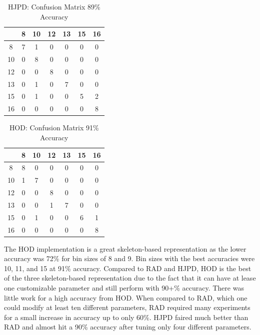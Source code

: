 \documentclass[11pt,nocopyrightspace]{config}
\begin{document}
\begin{table}[h]
\caption{HJPD: Confusion Matrix 89\% Accuracy}
\centering
\begin{tabular}{c c c c c c c}
\hline\hline
 & 8 & 10 & 12 & 13 & 15 & 16 \\ [0.5ex]
\hline
8 & 7 & 1 & 0 & 0 & 0 & 0 \\
10 & 0 & 8 & 0 & 0 & 0 & 0 \\
12 & 0 & 0 & 8 & 0 & 0 & 0 \\
13 & 0 & 1 & 0 & 7 & 0 & 0 \\
15 & 0 & 1 & 0 & 0 & 5 & 2 \\
16 & 0 & 0 & 0 & 0 & 0 & 8 \\
\hline
\end{tabular}
\label{table:hjpdConfusion}
\end{table}

\begin{table}[h]
\caption{HOD: Confusion Matrix 91\% Accuracy}
\centering
\begin{tabular}{c c c c c c c}
\hline\hline
 & 8 & 10 & 12 & 13 & 15 & 16 \\ [0.5ex]
\hline
8 & 8 & 0 & 0 & 0 & 0 & 0 \\
10 & 1 & 7 & 0 & 0 & 0 & 0 \\
12 & 0 & 0 & 8 & 0 & 0 & 0 \\
13 & 0 & 0 & 1 & 7 & 0 & 0 \\
15 & 0 & 1 & 0 & 0 & 6 & 1 \\
16 & 0 & 0 & 0 & 0 & 0 & 8 \\
\hline
\end{tabular}
\label{table:hodConfusion}
\end{table}

The HOD implementation is a great skeleton-based representation as the lower accuracy was 72\% for bin sizes of 8 and 9. Bin sizes with the best accuracies were 10, 11, and 15 at 91\% accuracy. Compared to RAD and HJPD, HOD is the best of the three skeleton-based representation due to the fact that it can have at lease one customizable parameter and still perform with 90+\% accuracy. There was little work for a high accuracy from HOD. When compared to RAD, which one could modify at least ten different parameters, RAD required many experiments for a small increase in accuracy up to only 60\%. HJPD faired much better than RAD and almost hit a 90\% accuracy after tuning only four different parameters.
\end{document}
